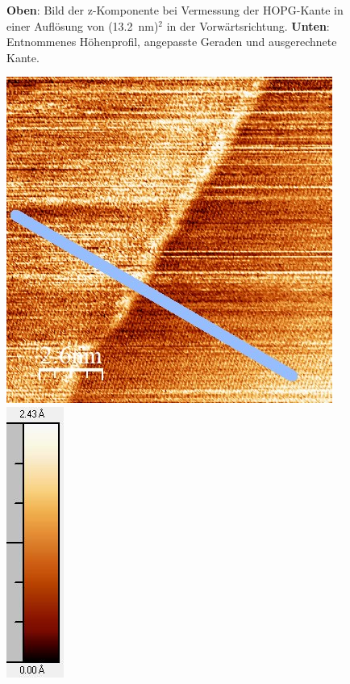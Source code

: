 \documentclass[12pt,a4paper]{article}
\begin{document}
\begin{figure}[H]
\caption{\textbf{Oben}: Bild der z-Komponente bei Vermessung der HOPG-Kante in einer Auflösung von (\SI{13,2}{nm})$^2$ in der Vorwärtsrichtung. \textbf{Unten}: Entnommenes Höhenprofil, angepasste Geraden und ausgerechnete Kante.}
\end{figure}

\begin{figure}[H]
\centering
\includegraphics[scale=0.6]{Bilder/Anhang/Kante/0132_Kante_nach.jpg}
\includegraphics[scale=0.7]{Bilder/Anhang/Kante/0132_Kante_nach_Skala.jpg}

\end{figure}
\end{document}
